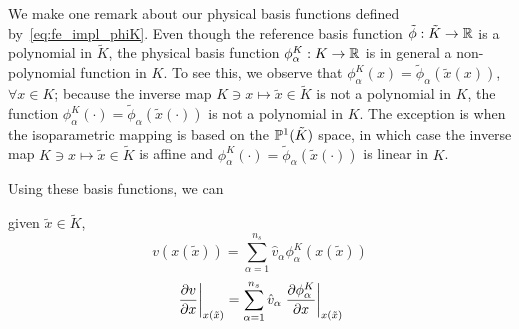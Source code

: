 \begin{figure}
  \centering
\end{figure}


We make one remark about our physical basis functions defined by~\eqref{eq:fe_impl_phiK}.  Even though the reference basis function $\tilde \phi: \tilde K \to \mathbb{R}$ is a polynomial in $\tilde K$, the physical basis function $\phi^K_\alpha: K \to \mathbb{R}$ is in general a non-polynomial function in $K$. To see this, we observe that $\phi^K_\alpha(x) = \tilde \phi_\alpha(\tilde x(x))$, $\forall x \in K$; because the inverse map $K \ni x \mapsto \tilde x \in \tilde K$ is not a polynomial in $K$, the function $\phi^K_\alpha(\cdot) = \tilde \phi_\alpha(\tilde x (\cdot))$ is not a polynomial in $K$.  The exception is when the isoparametric mapping is based on the $\mathbb{P}^1(\tilde K)$ space, in which case the inverse map $K \ni x \mapsto \tilde x \in \tilde K$ is affine and $\phi^K_\alpha(\cdot) = \tilde \phi_\alpha(\tilde x (\cdot))$ is linear in $K$.

Using these basis functions, we can 

given $\tilde x \in \tilde K$,
\begin{equation*}
  v(x(\tilde x))
  = \sum_{\alpha = 1}^{n_s} \hat v_\alpha \phi^K_\alpha(x(\tilde x))
\end{equation*}
\begin{equation*}
  \left. \frac{\partial v}{\partial x} \right|_{x(\tilde x)} 
  = \sum_{\alpha = 1}^{n_s} \hat v_\alpha \left. \frac{\partial \phi^K_\alpha}{\partial x} \right|_{x(\tilde x)}
\end{equation*}


